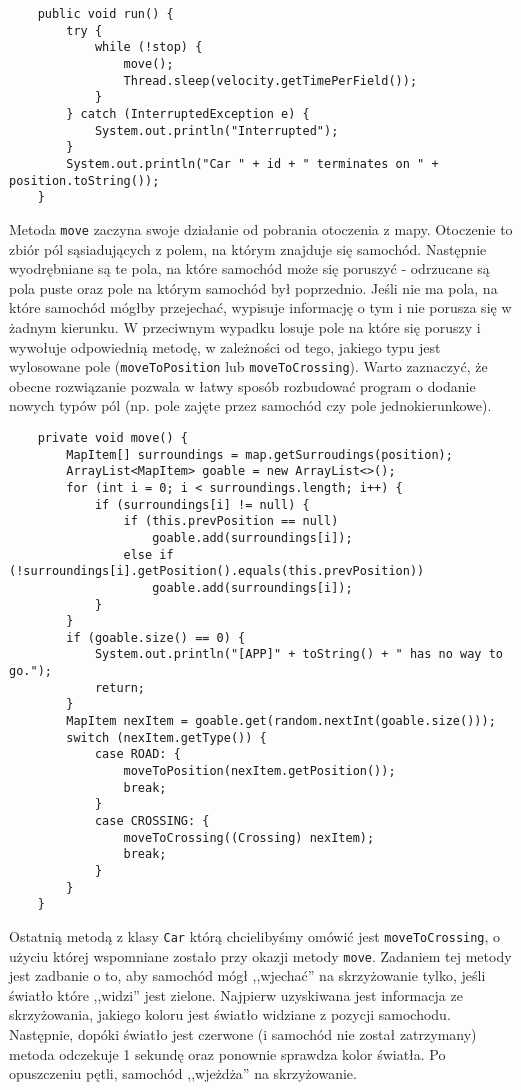 \documentclass[a4paper]{article}
\begin{document}
\begin{verbatim}
    public void run() {
        try {
            while (!stop) {
                move();
                Thread.sleep(velocity.getTimePerField());
            }
        } catch (InterruptedException e) {
            System.out.println("Interrupted");
        }
        System.out.println("Car " + id + " terminates on " + position.toString());
    }
\end{verbatim}
Metoda \verb+move+ zaczyna swoje działanie od pobrania otoczenia z mapy. Otoczenie to zbiór pól sąsiadujących z polem, na którym znajduje się samochód. Następnie wyodrębniane są te pola, na które samochód może się poruszyć - odrzucane są pola puste oraz pole na którym samochód był poprzednio. Jeśli nie ma pola, na które samochód mógłby przejechać, wypisuje informację o tym i nie porusza się w żadnym kierunku. W przeciwnym wypadku losuje pole na które się poruszy i wywołuje odpowiednią metodę, w zależności od tego, jakiego typu jest wylosowane pole (\verb+moveToPosition+ lub \verb+moveToCrossing+). Warto zaznaczyć, że obecne rozwiązanie pozwala w łatwy sposób rozbudować program o dodanie nowych typów pól (np. pole zajęte przez samochód czy pole jednokierunkowe). 
\begin{verbatim}
    private void move() {
        MapItem[] surroundings = map.getSurroudings(position);
        ArrayList<MapItem> goable = new ArrayList<>();
        for (int i = 0; i < surroundings.length; i++) {
            if (surroundings[i] != null) {
                if (this.prevPosition == null)
                    goable.add(surroundings[i]);
                else if (!surroundings[i].getPosition().equals(this.prevPosition))
                    goable.add(surroundings[i]);
            }
        }
        if (goable.size() == 0) {
            System.out.println("[APP]" + toString() + " has no way to go.");
            return;
        }
        MapItem nexItem = goable.get(random.nextInt(goable.size()));
        switch (nexItem.getType()) {
            case ROAD: {
                moveToPosition(nexItem.getPosition());
                break;
            }
            case CROSSING: {
                moveToCrossing((Crossing) nexItem);
                break;
            }
        }
    }

\end{verbatim}
Ostatnią metodą z klasy \verb+Car+ którą chcielibyśmy omówić jest \verb+moveToCrossing+, o użyciu której wspomniane zostało przy okazji metody \verb+move+. Zadaniem tej metody jest zadbanie o to, aby samochód mógł ,,wjechać'' na skrzyżowanie tylko, jeśli światło które ,,widzi'' jest zielone. Najpierw uzyskiwana jest informacja ze skrzyżowania, jakiego koloru jest światło widziane z pozycji samochodu. Następnie, dopóki światło jest czerwone (i samochód nie został zatrzymany) metoda odczekuje 1 sekundę oraz ponownie sprawdza kolor światła. Po opuszczeniu pętli, samochód ,,wjeżdża'' na skrzyżowanie.
\end{document}
